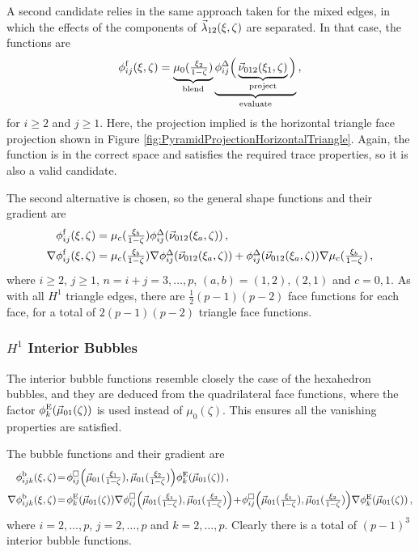A second candidate relies in the same approach taken for the mixed edges, in which the effects of the components of $\vec{\lambda}_{12}(\xi,\zeta)$ are separated. 
In that case, the functions are
\begin{equation*}
		\phi_{ij}^\mathrm{f}(\xi,\zeta)=\underbrace{\mu_0(\textstyle{\frac{\xi_2}{1-\zeta}})}_{\text{blend}}
    	\underbrace{\phi_{ij}^\Delta\Big(\underbrace{\vec{\nu}_{012}(\xi_1,\zeta)}_{\text{project}}\Big)}_{\text{evaluate}}\,,
\end{equation*}
for $i\geq2$ and $j\geq1$.
Here, the projection implied is the horizontal triangle face projection shown in Figure \ref{fig:PyramidProjectionHorizontalTriangle}.
Again, the function is in the correct space and satisfies the required trace properties, so it is also a valid candidate.

The second alternative is chosen, so the general shape functions and their gradient are
\begin{equation}
	\begin{aligned}
		\phi_{ij}^\mathrm{f}(\xi,\zeta)&=\mu_c(\textstyle{\frac{\xi_b}{1-\zeta}})\phi_{ij}^\Delta(\vec{\nu}_{012}(\xi_a,\zeta))\,,\\
    	\nabla\phi_{ij}^\mathrm{f}(\xi,\zeta)&=\mu_c(\textstyle{\frac{\xi_b}{1-\zeta}})\nabla\phi_{ij}^\Delta(\vec{\nu}_{012}(\xi_a,\zeta))
        +\phi_{ij}^\Delta(\vec{\nu}_{012}(\xi_a,\zeta))\nabla\mu_c(\textstyle{\frac{\xi_b}{1-\zeta}})\,,	
	\end{aligned}
	\label{eq:PyrH1TriaFace}
\end{equation}
where $i\geq2$, $j\geq1$, $n=i+j=3,\ldots,p$, $(a,b)=(1,2),(2,1)$ and $c=0,1$.
As with all $H^1$ triangle edges, there are $\frac{1}{2}(p-1)(p-2)$ face functions for each face, for a total of $2(p-1)(p-2)$ triangle face functions.

\subsubsection{\texorpdfstring{$H^1$}{H1} Interior Bubbles}

The interior bubble functions resemble closely the case of the hexahedron bubbles, and they are deduced from the quadrilateral face functions, where the factor $\phi_k^{\mathrm{E}}(\vec{\mu}_{01}(\zeta))$ is used instead of $\mu_0(\zeta)$.
This ensures all the vanishing properties are satisfied.

The bubble functions and their gradient are
\begin{equation}
	\begin{aligned}
		\phi_{ijk}^\mathrm{b}(\xi,\zeta)&\!=\!
			\phi_{ij}^\square\Big(\vec{\mu}_{01}(\textstyle{\frac{\xi_1}{1-\zeta}}),\vec{\mu}_{01}(\textstyle{\frac{\xi_2}{1-\zeta}})\Big)\phi_k^{\mathrm{E}}(\vec{\mu}_{01}(\zeta))\,,\\
    		\nabla\phi_{ijk}^\mathrm{b}(\xi,\zeta)&\!=\!\phi_k^{\mathrm{E}}(\vec{\mu}_{01}(\zeta))
    			\nabla\phi_{ij}^\square\Big(\vec{\mu}_{01}(\textstyle{\frac{\xi_1}{1-\zeta}}),\vec{\mu}_{01}(\textstyle{\frac{\xi_2}{1-\zeta}})\Big)
        		\!+\!\phi_{ij}^\square\Big(\vec{\mu}_{01}(\textstyle{\frac{\xi_1}{1-\zeta}}),\vec{\mu}_{01}(\textstyle{\frac{\xi_2}{1-\zeta}})\Big)\nabla\phi_k^{\mathrm{E}}(\vec{\mu}_{01}(\zeta))\,,	
	\end{aligned}
	\label{eq:PyrH1Interior}
\end{equation}
where $i=2,\ldots,p$, $j=2,\ldots,p$ and $k=2,\ldots,p$.
Clearly there is a total of $(p-1)^3$ interior bubble functions.

